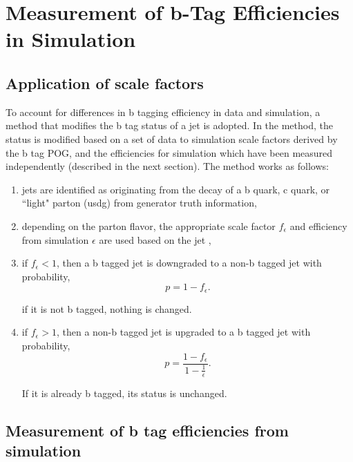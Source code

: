 \section{Measurement of b-Tag Efficiencies in Simulation}


\subsection{Application of scale factors}

To account for differences in b tagging efficiency in data and 
simulation, a method that modifies the b tag status of a jet is adopted.
In the method, the status is modified based on a set of data to
simulation scale factors derived by the b tag POG, and the efficiencies
for simulation which have been measured independently (described in the
next section).  The method works as follows:

\begin{enumerate}
    \item jets are identified as originating from the decay of a b
    quark, c quark, or ``light" parton (usdg) from generator truth information,
    
    \item depending on the parton flavor, the appropriate scale factor $f_{\epsilon}$ 
    and efficiency from simulation $\epsilon$ are used
    based on the jet \pt,
    
    \item if $f_{\epsilon} < 1$, then a b tagged jet is downgraded to a
    non-b tagged jet with probability,
    \begin{equation}
        p = 1 - f_{\epsilon}.
    \end{equation}

    \noindent if it is not b tagged, nothing is changed.
    
    
    \item if $f_{\epsilon} > 1$, then a non-b tagged jet is upgraded to
    a b tagged jet with probability,
    \begin{equation}
        p = \frac{1 - f_{\epsilon}}{1 - \frac{1}{\epsilon}}.
    \end{equation}

    \noindent If it is already b  tagged, its status is unchanged.
\end{enumerate}

\subsection{Measurement of b tag efficiencies from simulation}

